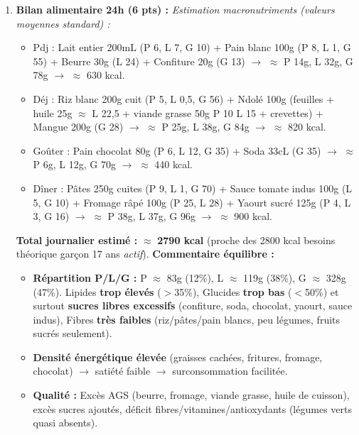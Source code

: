 \documentclass[11pt]{article}
\begin{document}
\begin{corrige}
\begin{enumerate}
\item \textbf{Bilan alimentaire 24h (6 pts) :}
\textit{Estimation macronutriments (valeurs moyennes standard) :}
\begin{itemize}
\item Pdj : Lait entier 200mL (P 6, L 7, G 10) + Pain blanc 100g (P 8, L 1, G 55) + Beurre 30g (L 24) + Confiture 20g (G 13) $\rightarrow$ $\approx$ P 14g, L 32g, G 78g $\rightarrow$ $\approx$ 630 kcal.
\item Déj : Riz blanc 200g cuit (P 5, L 0,5, G 56) + Ndolé 100g (feuilles + huile 25g $\approx$ L 22,5 + viande grasse 50g P 10 L 15 + crevettes) + Mangue 200g (G 28) $\rightarrow$ $\approx$ P 25g, L 38g, G 84g $\rightarrow$ $\approx$ 820 kcal.
\item Goûter : Pain chocolat 80g (P 6, L 12, G 35) + Soda 33cL (G 35) $\rightarrow$ $\approx$ P 6g, L 12g, G 70g $\rightarrow$ $\approx$ 440 kcal.
\item Dîner : Pâtes 250g cuites (P 9, L 1, G 70) + Sauce tomate indus 100g (L 5, G 10) + Fromage râpé 100g (P 25, L 28) + Yaourt sucré 125g (P 4, L 3, G 16) $\rightarrow$ $\approx$ P 38g, L 37g, G 96g $\rightarrow$ $\approx$ 900 kcal.
\end{itemize}
\textbf{Total journalier estimé :} $\approx$ \textbf{2790 kcal} (proche des 2800 kcal besoins théorique garçon 17 ans \emph{actif}).
\textbf{Commentaire équilibre :}
\begin{itemize}
\item \textbf{Répartition P/L/G :} P $\approx$ 83g (12\%), L $\approx$ 119g (38\%), G $\approx$ 328g (47\%). Lipides \textbf{trop élevés} ($>$35\%), Glucides \textbf{trop bas} ($<$50\%) et surtout \textbf{sucres libres excessifs} (confiture, soda, chocolat, yaourt, sauce indus), Fibres \textbf{très faibles} (riz/pâtes/pain blancs, peu légumes, fruits sucrés seulement).
\item \textbf{Densité énergétique élevée} (graisses cachées, fritures, fromage, chocolat) $\rightarrow$ satiété faible $\rightarrow$ surconsommation facilitée.
\item \textbf{Qualité :} Excès AGS (beurre, fromage, viande grasse, huile de cuisson), excès sucres ajoutés, déficit fibres/vitamines/antioxydants (légumes verts quasi absents).
\end{itemize}


\end{enumerate}
\end{corrige}
\end{document}

